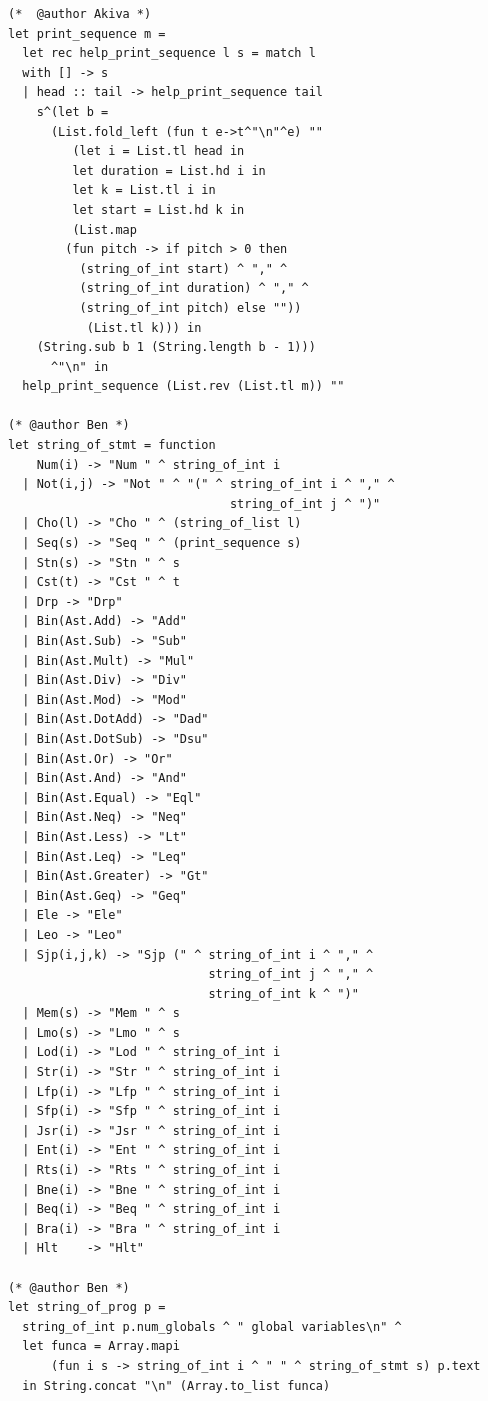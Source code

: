 \documentclass[12pt,A4]{book}
\begin{document}
\begin{verbatim}
(*  @author Akiva *)
let print_sequence m = 
  let rec help_print_sequence l s = match l 
  with [] -> s 
  | head :: tail -> help_print_sequence tail 
	s^(let b = 
	  (List.fold_left (fun t e->t^"\n"^e) "" 
	     (let i = List.tl head in 
	     let duration = List.hd i in 
	     let k = List.tl i in 
	     let start = List.hd k in 
	     (List.map 
		(fun pitch -> if pitch > 0 then
		  (string_of_int start) ^ "," ^ 
		  (string_of_int duration) ^ "," ^ 
		  (string_of_int pitch) else ""))
	       (List.tl k))) in 
	(String.sub b 1 (String.length b - 1)))
      ^"\n" in 
  help_print_sequence (List.rev (List.tl m)) ""
    
(* @author Ben *)
let string_of_stmt = function
    Num(i) -> "Num " ^ string_of_int i
  | Not(i,j) -> "Not " ^ "(" ^ string_of_int i ^ "," ^ 
                               string_of_int j ^ ")"
  | Cho(l) -> "Cho " ^ (string_of_list l)
  | Seq(s) -> "Seq " ^ (print_sequence s)
  | Stn(s) -> "Stn " ^ s
  | Cst(t) -> "Cst " ^ t
  | Drp -> "Drp"
  | Bin(Ast.Add) -> "Add"
  | Bin(Ast.Sub) -> "Sub"
  | Bin(Ast.Mult) -> "Mul"
  | Bin(Ast.Div) -> "Div"
  | Bin(Ast.Mod) -> "Mod"
  | Bin(Ast.DotAdd) -> "Dad"
  | Bin(Ast.DotSub) -> "Dsu"
  | Bin(Ast.Or) -> "Or"
  | Bin(Ast.And) -> "And"
  | Bin(Ast.Equal) -> "Eql"
  | Bin(Ast.Neq) -> "Neq"
  | Bin(Ast.Less) -> "Lt"
  | Bin(Ast.Leq) -> "Leq"
  | Bin(Ast.Greater) -> "Gt"
  | Bin(Ast.Geq) -> "Geq"
  | Ele -> "Ele"
  | Leo -> "Leo"
  | Sjp(i,j,k) -> "Sjp (" ^ string_of_int i ^ "," ^ 
                            string_of_int j ^ "," ^ 
                            string_of_int k ^ ")"
  | Mem(s) -> "Mem " ^ s
  | Lmo(s) -> "Lmo " ^ s
  | Lod(i) -> "Lod " ^ string_of_int i
  | Str(i) -> "Str " ^ string_of_int i
  | Lfp(i) -> "Lfp " ^ string_of_int i
  | Sfp(i) -> "Sfp " ^ string_of_int i
  | Jsr(i) -> "Jsr " ^ string_of_int i
  | Ent(i) -> "Ent " ^ string_of_int i
  | Rts(i) -> "Rts " ^ string_of_int i
  | Bne(i) -> "Bne " ^ string_of_int i
  | Beq(i) -> "Beq " ^ string_of_int i
  | Bra(i) -> "Bra " ^ string_of_int i
  | Hlt    -> "Hlt"

(* @author Ben *)
let string_of_prog p =
  string_of_int p.num_globals ^ " global variables\n" ^
  let funca = Array.mapi
      (fun i s -> string_of_int i ^ " " ^ string_of_stmt s) p.text
  in String.concat "\n" (Array.to_list funca)
\end{verbatim}
\end{document}
